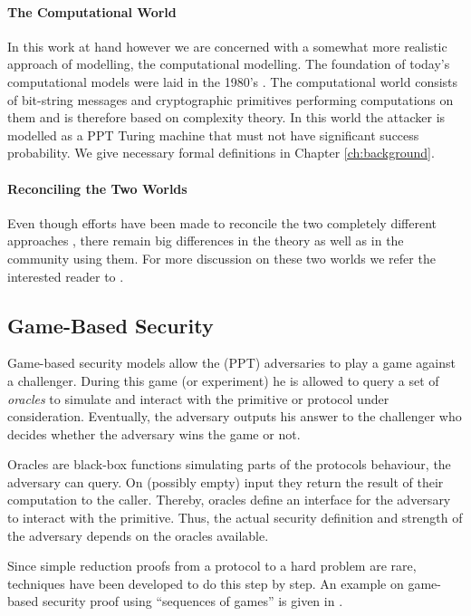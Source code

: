 \paragraph{The Computational World}
In this work at hand however we are concerned with a somewhat more realistic approach of modelling, the computational modelling.
The foundation of today's computational models were laid in the 1980's \cite{Goldwasser82,Goldwasser84,Yao82,Blum82}.
The computational world consists of bit-string messages and cryptographic primitives performing computations on them and is therefore based on complexity theory.
In this world the attacker is modelled as a \ac{PPT} Turing machine \cite{Turing37} that must not have significant success probability.
We give necessary formal definitions in Chapter \ref{ch:background}.
%

\paragraph{Reconciling the Two Worlds}
Even though efforts have been made to reconcile the two completely different approaches \cite{Abadi2002,Herzog2005}, there remain big differences in the theory as well as in the community using them.
For more discussion on these two worlds we refer the interested reader to \cite{cortier2011survey}.

\subsection{Game-Based Security}
Game-based security models allow the (\ac{PPT}) adversaries to play a game against a challenger.
During this game (or experiment) he is allowed to query a set of \emph{oracles} to simulate and interact with the primitive or protocol under consideration.
Eventually, the adversary outputs his answer to the challenger who decides whether the adversary wins the game or not.

Oracles are black-box functions simulating parts of the protocols behaviour, the adversary can query.
On (possibly empty) input they return the result of their computation to the caller.
Thereby, oracles define an interface for the adversary to interact with the primitive.
Thus, the actual security definition and strength of the adversary depends on the oracles available.

Since simple reduction proofs from a protocol to a hard problem are rare, techniques have been developed to do this step by step.
An example on game-based security proof using ``sequences of games'' is given in \cite{Shoup2004}.

